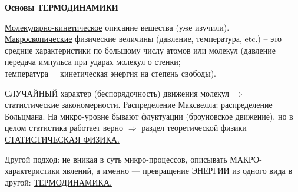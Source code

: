 \documentclass[12pt,epsfig,color,russian]{article}
\begin{document}
\sf\Large
\centerline{\LARGE\bf Основы ТЕРМОДИНАМИКИ}
\underline{Молекулярно-кинетическое} описание вещества (уже изучили).\\
\underline{Макроскопические} физические величины (давление, температура, etc.) -- это средние характеристики по большому числу атомов или молекул (давление = передача импульса при ударах молекул о стенки;\\
 температура = кинетическая энергия на степень свободы).

СЛУЧАЙНЫЙ характер (беспорядочность) движения молекул $\Rightarrow$ ста\-ти\-с\-ти\-че\-с\-кие закономерности. Распределение Максвелла; распределение Больцмана. На микро-уровне бывают флуктуации (броуновское движение), но в целом статистика работает верно $\Rightarrow$ раздел теоретической физики \underline{СТАТИСТИЧЕСКАЯ ФИЗИКА.}

Другой подход: не вникая в суть микро-процессов, описывать МАКРО-характеристики явлений, а именно --- превращение ЭНЕРГИИ из одного вида в другой: \underline{ТЕРМОДИНАМИКА.}\\
\end{document}
